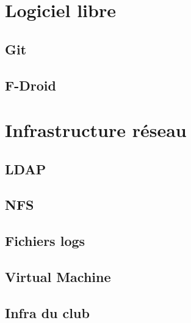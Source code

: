 \documentclass[french, a4paper, 12pt, titlepage]{article}
\begin{document}
\section{Logiciel libre}
	
  \subsection{Git}
    
  \subsection{F-Droid}
    
    
\section{Infrastructure réseau}
  \subsection{LDAP}
    
  \subsection{NFS}
    
  \subsection{Fichiers logs}
    
  \subsection{Virtual Machine}
    
  \subsection{Infra du club}
    
\end{document}
